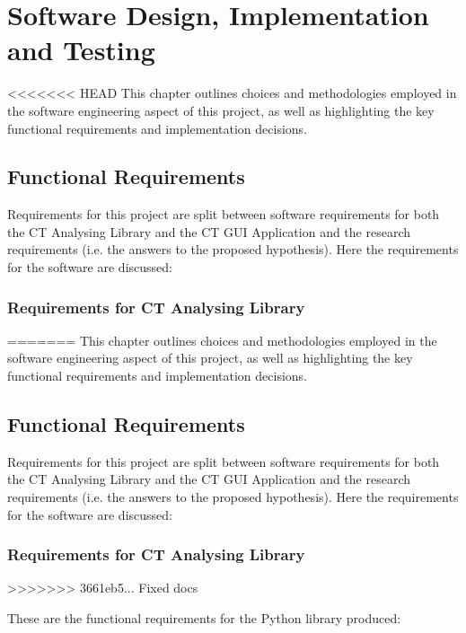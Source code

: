 \documentclass[11pt]{report}
\begin{document}
\chapter{Software Design, Implementation and Testing}
<<<<<<< HEAD
\label{sec:org16acc1b}
This chapter outlines choices and methodologies employed in the software engineering aspect of this project, as well as highlighting the key functional requirements and implementation decisions.

\section{Functional Requirements}
\label{sec:org543126c}
Requirements for this project are split between software requirements for both the CT Analysing Library and the CT GUI Application and the research requirements (i.e. the answers to the proposed hypothesis). Here the requirements for the software are discussed:
\subsection{Requirements for CT Analysing Library}
\label{sec:orge669ddc}
=======
\label{sec:org44c4d8e}
This chapter outlines choices and methodologies employed in the software engineering aspect of this project, as well as highlighting the key functional requirements and implementation decisions.

\section{Functional Requirements}
\label{sec:org44f5a0d}
Requirements for this project are split between software requirements for both the CT Analysing Library and the CT GUI Application and the research requirements (i.e. the answers to the proposed hypothesis). Here the requirements for the software are discussed:
\subsection{Requirements for CT Analysing Library}
\label{sec:org34679c6}
>>>>>>> 3661eb5... Fixed docs

These are the functional requirements for the Python library produced:
\end{document}
